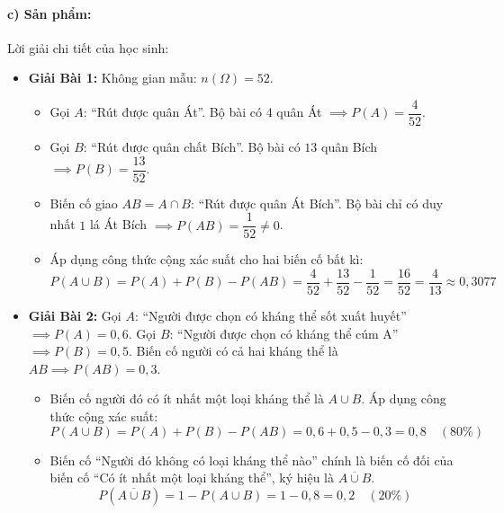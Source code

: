 \documentclass[12pt, a4paper]{article}
\begin{document}
\paragraph{c) Sản phẩm:} Lời giải chi tiết của học sinh:
\begin{itemize}[leftmargin=0.8cm]
    \item \textbf{Giải Bài 1:}
    Không gian mẫu: $n(\Omega) = 52$.
    \begin{itemize}[leftmargin=0.4cm]
        \item Gọi $A$: ``Rút được quân Át''. Bộ bài có $4$ quân Át $\implies P(A) = \dfrac{4}{52}$.
        \item Gọi $B$: ``Rút được quân chất Bích''. Bộ bài có $13$ quân Bích $\implies P(B) = \dfrac{13}{52}$.
        \item Biến cố giao $AB = A \cap B$: ``Rút được quân Át Bích''. Bộ bài chỉ có duy nhất $1$ lá Át Bích $\implies P(AB) = \dfrac{1}{52} \neq 0$.
        \item Áp dụng công thức cộng xác suất cho hai biến cố bất kì:
        $$P(A \cup B) = P(A) + P(B) - P(AB) = \dfrac{4}{52} + \dfrac{13}{52} - \dfrac{1}{52} = \dfrac{16}{52} = \dfrac{4}{13} \approx 0{,}3077$$
    \end{itemize}
    \item \textbf{Giải Bài 2:}
    Gọi $A$: ``Người được chọn có kháng thể sốt xuất huyết'' $\implies P(A) = 0{,}6$.
    Gọi $B$: ``Người được chọn có kháng thể cúm A'' $\implies P(B) = 0{,}5$.
    Biến cố người có cả hai kháng thể là $AB \implies P(AB) = 0{,}3$.
    \begin{itemize}[leftmargin=0.4cm]
        \item[a)] Biến cố người đó có ít nhất một loại kháng thể là $A \cup B$.
        Áp dụng công thức cộng xác suất:
        $$P(A \cup B) = P(A) + P(B) - P(AB) = 0{,}6 + 0{,}5 - 0{,}3 = 0{,}8 \quad (80\%)$$
        \item[b)] Biến cố ``Người đó không có loại kháng thể nào'' chính là biến cố đối của biến cố ``Có ít nhất một loại kháng thể'', ký hiệu là $\overline{A \cup B}$.
        $$P\left(\overline{A \cup B}\right) = 1 - P(A \cup B) = 1 - 0{,}8 = 0{,}2 \quad (20\%)$$
    \end{itemize}
\end{itemize}
\end{document}
